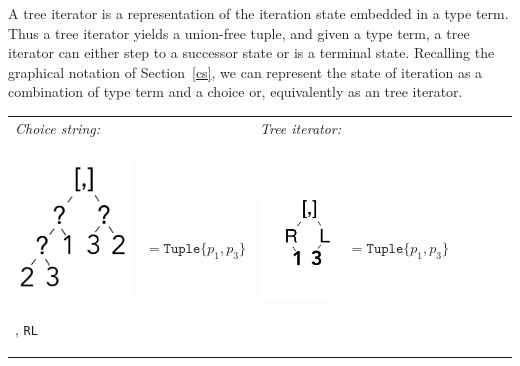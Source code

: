 \documentclass[a4paper,english]{lipics-v2019}
\newcommand{\xt}[1]{\texttt{#1}}
\renewcommand{\L}{{\tt L}\xspace}
\newcommand{\R}{{\tt R}\xspace}
\newcommand{\tuple}[1]{\xt{Tuple\{}#1\xt{\}}}
\begin{document}
A tree iterator is a representation of the iteration state embedded in a
type term. Thus a tree iterator yields a union-free tuple, and given a type
term, a tree iterator can either step to a successor state or is a terminal
state. Recalling the graphical notation of Section~\ref{cs}, we can
represent the state of iteration as a combination of type term and a choice
or, equivalently as an tree iterator. 

\medskip
{\small
\begin{tabular}{@{}l@{~}ll@{~}ll@{~}ll@{~}l}
\it Choice string: &&  \multicolumn{2}{l}{\it Tree iterator:}\\[2mm]
\begin{minipage}{1.2cm}\includegraphics[scale=.25]{figures/tree1.pdf} 
\end{minipage} , \R\L & $ =   \tuple{p_1,p_3} $ 
&\begin{minipage}{1.2cm}\includegraphics[scale=.25]{figures/tree8.pdf}
\end{minipage}& $=\tuple{p_1,p_3}$
\end{tabular}}
\end{document}
